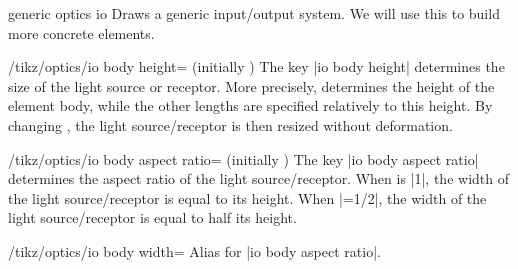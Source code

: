 \documentclass[a4paper]{ltxdoc}
\begin{document}
\begin{shape}{generic optics io}
Draws a generic input/output system.
We will use this to build more concrete elements.

\begin{codeexample}[width=6cm]
\end{codeexample}


\begin{key}{/tikz/optics/io body height= (initially )}
    The key |io body height| determines the size of the light source or receptor. 
    More precisely,  determines the height of the element body, while the other lengths are specified relatively to this height.
    By changing , the light source/receptor is then resized without deformation.

    \begin{codeexample}[]
    \end{codeexample}
\end{key}

\begin{key}{/tikz/optics/io body aspect ratio= (initially )}
    The key |io body aspect ratio| determines the aspect ratio of the light source/receptor.
    When  is |1|, the width of the light source/receptor is equal to its height.
    When |=1/2|, the width of the light source/receptor is equal to half its height.

    \begin{codeexample}[]
    \end{codeexample}
\end{key}

\begin{stylekey}{/tikz/optics/io body width=}
Alias for |io body aspect ratio|.
\end{stylekey}



\end{shape}
\end{document}
